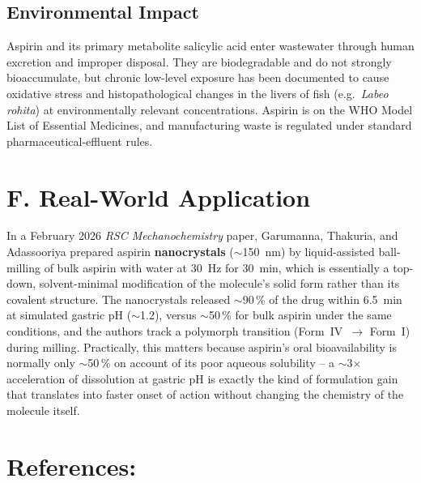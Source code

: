 \documentclass[9pt]{extarticle}
\begin{document}
\subsection*{Environmental Impact}
Aspirin and its primary metabolite salicylic acid enter wastewater
through human excretion and improper
disposal. They are biodegradable and do not strongly bioaccumulate, but
chronic low-level exposure has been documented to cause oxidative
stress and histopathological changes in the livers of fish (e.g.\
\emph{Labeo rohita}) at environmentally relevant concentrations.
Aspirin is on the WHO Model List of Essential Medicines, and
manufacturing waste is regulated under standard pharmaceutical-effluent
rules.

\section*{F. Real-World Application}

In a February 2026 \emph{RSC Mechanochemistry} paper, Garumanna,
Thakuria, and Adassooriya prepared aspirin \textbf{nanocrystals}
($\sim$150~nm) by liquid-assisted ball-milling of bulk aspirin with
water at 30~Hz for 30~min, which is essentially a top-down,
solvent-minimal modification of the molecule's solid form rather than
its covalent structure. The nanocrystals released $\sim$90\,\% of the
drug within 6.5~min at simulated gastric pH ($\sim$1.2), versus
$\sim$50\,\% for bulk aspirin under the same conditions, and the
authors track a polymorph transition (Form~IV~$\rightarrow$ Form~I)
during milling. Practically, this matters because aspirin's oral
bioavailability is normally only $\sim$50\,\% on account of its poor
aqueous solubility -- a $\sim$3$\times$ acceleration of dissolution at
gastric pH is exactly the kind of formulation gain that translates into
faster onset of action without changing the chemistry of the molecule
itself.

\section*{References:}
\end{document}
